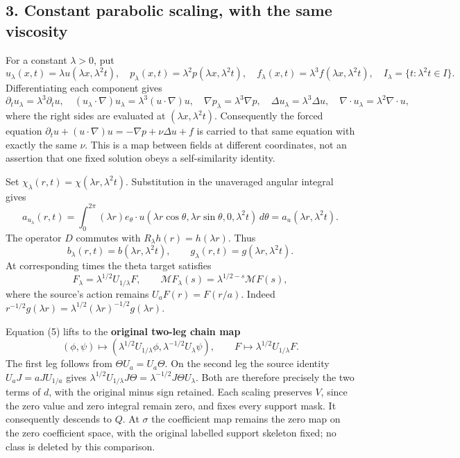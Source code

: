 \subsection{3. Constant parabolic scaling, with the same
viscosity}\label{TranscriptStage:proof09:constant-parabolic-scaling-with-the-same-viscosity}

For a constant \(\lambda>0\), put \[
u_\lambda(x,t)=\lambda u(\lambda x,\lambda^2t),\quad
p_\lambda(x,t)=\lambda^2p(\lambda x,\lambda^2t),\quad
f_\lambda(x,t)=\lambda^3f(\lambda x,\lambda^2t),
\quad I_\lambda=\{t:\lambda^2t\in I\}.
\] Differentiating each component gives \[
\partial_tu_\lambda=\lambda^3\partial_tu,\quad
(u_\lambda\cdot\nabla)u_\lambda=\lambda^3(u\cdot\nabla)u,\quad
\nabla p_\lambda=\lambda^3\nabla p,\quad
\Delta u_\lambda=\lambda^3\Delta u,
\quad \nabla\cdot u_\lambda=\lambda^2\nabla\cdot u,
\] where the right sides are evaluated at \((\lambda x,\lambda^2t)\).
Consequently the forced equation
\(\partial_tu+(u\cdot\nabla)u=-\nabla p+\nu\Delta u+f\) is carried to
that same equation with exactly the same \(\nu\). This is a map between
fields at different coordinates, not an assertion that one fixed
solution obeys a self-similarity identity.

Set \(\chi_\lambda(r,t)=\chi(\lambda r,\lambda^2t)\). Substitution in
the unaveraged angular integral gives \[
a_{u_\lambda}(r,t)=\int_0^{2\pi}(\lambda r)e_\theta\cdot u(\lambda r\cos\theta,\lambda r\sin\theta,0,\lambda^2t)\,d\theta
=a_u(\lambda r,\lambda^2t).
\] The operator \(D\) commutes with \(R_\lambda h(r)=h(\lambda r)\).
Thus \[
b_\lambda(r,t)=b(\lambda r,\lambda^2t),\qquad
g_\lambda(r,t)=g(\lambda r,\lambda^2t).
\tag{4}
\] At corresponding times the theta target satisfies \[
\boxed{F_\lambda=\lambda^{1/2}U_{1/\lambda}F,\qquad
\mathcal MF_\lambda(s)=\lambda^{1/2-s}\mathcal MF(s),}
\tag{5}
\] where the source's action remains \(U_aF(r)=F(r/a)\). Indeed
\(r^{-1/2}g(\lambda r)=\lambda^{1/2}(\lambda r)^{-1/2}g(\lambda r)\).

Equation (5) lifts to the \textbf{original two-leg chain map} \[
(\phi,\psi)\longmapsto
(\lambda^{1/2}U_{1/\lambda}\phi,\lambda^{-1/2}U_\lambda\psi),\qquad
F\longmapsto\lambda^{1/2}U_{1/\lambda}F.
\tag{6}
\] The first leg follows from \(\Theta U_a=U_a\Theta\). On the second
leg the source identity \(U_aJ=aJU_{1/a}\) gives
\(\lambda^{1/2}U_{1/\lambda}J\Theta=\lambda^{-1/2}J\Theta U_\lambda\).
Both are therefore precisely the two terms of \(d\), with the original
minus sign retained. Each scaling preserves \(V\), since the zero value
and zero integral remain zero, and fixes every support mask. It
consequently descends to \(Q\). At \(\sigma\) the coefficient map
remains the zero map on the zero coefficient space, with the original
labelled support skeleton fixed; no class is deleted by this comparison.

